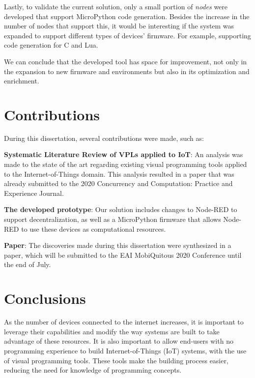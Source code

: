 Lastly, to validate the current solution, only a small portion of \textit{nodes} were developed that support MicroPython code generation. Besides the increase in the number of nodes that support this, it would be interesting if the system was expanded to support different types of devices' firmware. For example, supporting code generation for C and Lua.

We can conclude that the developed tool has space for improvement, not only in the expansion to new firmware and environments but also in its optimization and enrichment.

\section{Contributions}\label{sec:contributions}
During this dissertation, several contributions were made, such as:

\begin{description}
    \item \textbf{Systematic Literature Review of VPLs applied to IoT}: An analysis was made to the state of the art regarding existing visual programming tools applied to the Internet-of-Things domain. This analysis resulted in a paper that was already submitted to the 2020 Concurrency and Computation: Practice and Experience Journal.
    \item \textbf{The developed prototype}: Our solution includes changes to Node-RED to support decentralization, as well as a MicroPython firmware that allows Node-RED to use these devices as computational resources.
    \item \textbf{Paper}: The discoveries made during this dissertation were synthesized in a paper, which will be submitted to the EAI MobiQuitous 2020 Conference until the end of July.
\end{description}


\section{Conclusions}\label{sec:conclusion_conclusions}

As the number of devices connected to the internet increases, it is important to leverage their capabilities and modify the way systems are built to take advantage of these resources. It is also important to allow end-users with no programming experience to build Internet-of-Things (IoT) systems, with the use of visual programming tools. These tools make the building process easier, reducing the need for knowledge of programming concepts.

